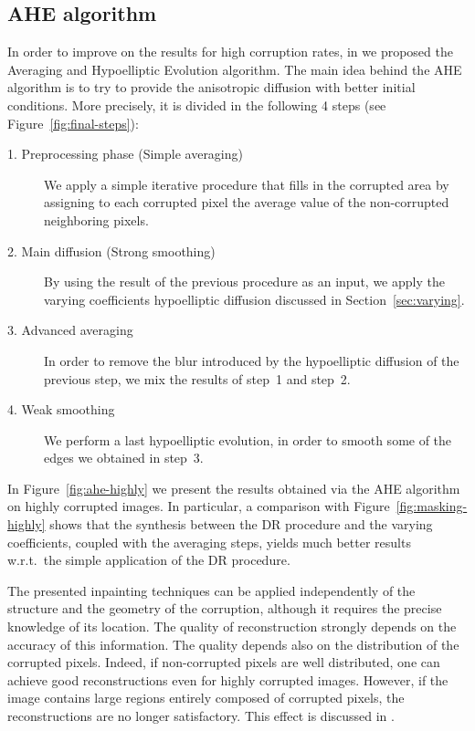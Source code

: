 \documentclass[proc]{edpsmath}
\begin{document}
\subsection{AHE algorithm}

In order to improve on the results for high corruption rates, in \cite{ahe} we proposed the Averaging and Hypoelliptic Evolution algorithm.
The main idea behind the AHE algorithm is to try to provide the anisotropic diffusion with better initial conditions.
More precisely, it is divided in the following 4 steps (see Figure~\ref{fig:final-steps}):
\begin{description}
	\item [1. Preprocessing phase (Simple averaging)] We apply a simple iterative procedure that fills in the corrupted area by assigning to each corrupted pixel the average value of the non-corrupted neighboring pixels.
	\item [2. Main diffusion (Strong smoothing)] By using the result of the previous procedure as an input, we apply the varying coefficients hypoelliptic diffusion discussed in Section~\ref{sec:varying}.
	\item [3. Advanced averaging] In order to remove the blur introduced by the hypoelliptic diffusion of the previous step, we mix the results of step~1 and step~2.
	\item [4. Weak smoothing] We perform a last hypoelliptic evolution, in order to smooth some of the edges we obtained in step~3.
\end{description}

In Figure~\ref{fig:ahe-highly} we present the results obtained via the AHE algorithm on highly corrupted images. In particular, a comparison with Figure~\ref{fig:masking-highly} shows that the synthesis between the DR procedure and the varying coefficients, coupled with the averaging steps, yields much better results w.r.t.\ the simple application of the DR procedure.

The presented inpainting techniques can be
applied independently of the structure and the geometry
of the corruption, although it requires the precise
knowledge of its location. The quality of reconstruction
strongly depends on the accuracy of this information.
The quality depends also on the distribution of the corrupted pixels.
Indeed, if non-corrupted pixels are well distributed,
one can achieve good reconstructions even for highly corrupted images.
However, if the image contains large regions entirely composed of corrupted pixels, 
the reconstructions are no longer satisfactory.
This effect is discussed in \cite{ahe}.
\end{document}
